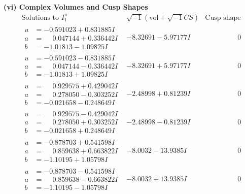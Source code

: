 \documentclass[1p]{elsarticle_modified}
\theoremstyle{definition}
\newcommand{\I}{\sqrt{-1}}
\begin{document}
\newpage\flushleft \textbf{(vi) Complex Volumes and Cusp Shapes}
$$\begin{array}{c|c|c}  
\text{Solutions to }I^u_{1}& \I (\text{vol} + \sqrt{-1}CS) & \text{Cusp shape}\\
 \hline 
\begin{aligned}
u &= -0.591023 + 0.831885 I \\
a &= \phantom{-}0.047144 + 0.336442 I \\
b &= -1.01813 - 1.09825 I\end{aligned}
 & -8.32691 - 5.97177 I & \phantom{-0.000000 } 0 \\ \hline\begin{aligned}
u &= -0.591023 - 0.831885 I \\
a &= \phantom{-}0.047144 - 0.336442 I \\
b &= -1.01813 + 1.09825 I\end{aligned}
 & -8.32691 + 5.97177 I & \phantom{-0.000000 } 0 \\ \hline\begin{aligned}
u &= \phantom{-}0.929575 + 0.429042 I \\
a &= \phantom{-}0.278050 - 0.303252 I \\
b &= -0.021658 - 0.248649 I\end{aligned}
 & -2.48998 + 0.81239 I & \phantom{-0.000000 } 0 \\ \hline\begin{aligned}
u &= \phantom{-}0.929575 - 0.429042 I \\
a &= \phantom{-}0.278050 + 0.303252 I \\
b &= -0.021658 + 0.248649 I\end{aligned}
 & -2.48998 - 0.81239 I & \phantom{-0.000000 } 0 \\ \hline\begin{aligned}
u &= -0.878703 + 0.541598 I \\
a &= \phantom{-}0.859638 + 0.663822 I \\
b &= -1.10195 + 1.05798 I\end{aligned}
 & -8.0032 - 13.9385 I & \phantom{-0.000000 } 0 \\ \hline\begin{aligned}
u &= -0.878703 - 0.541598 I \\
a &= \phantom{-}0.859638 - 0.663822 I \\
b &= -1.10195 - 1.05798 I\end{aligned}
 & -8.0032 + 13.9385 I & \phantom{-0.000000 } 0 \\ \hline\begin{aligned}

\end{aligned}
\end{array}$$
\end{document}
